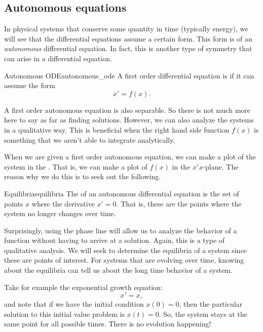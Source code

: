             \subsection{Autonomous equations}

                In physical systems that conserve some quantity in time (typically energy), we will see that the differential equations assume a certain form.  This form is of an \emph{autonomous} differential equation. In fact, this is another type of symmetry that can arise in a differential equation.

                \begin{df}{Autonomous ODE}{autonomous_ode}
                    A first order differential equation is  if it can assume the form
                    \[
                    x'=f(x).
                    \]
                \end{df}
                \noindent A first order autonomous equation is also separable. So there is not much more here to say as far as finding solutions. However, we can also analyze the systems in a qualitative way.  This is beneficial when the right hand side function $f(x)$ is something that we aren't able to integrate analytically.

                When we are given a first order autonomous equation, we can make a plot of the system in the . That is, we can make a plot of $f(x)$ in the $x'x$-plane.  The reason why we do this is to seek out the following.

                \begin{df}{Equilibria}{equilibria}
                    The  of an autonomous differential equation is the set of points $x$ where the derivative $x'=0$. That is, these are the points where the system no longer changes over time.
                \end{df}

                Surprisingly, using the phase line will allow us to analyze the behavior of a function without having to arrive at a solution. Again, this is a type of qualitative analysis. We will seek to determine the equilibria of a system since these are points of interest. For systems that are evolving over time, knowing about the equilibria can tell us about the long time behavior of a system.

                Take for example the exponential growth equation:
                \[
                x'=x,
                \]
                and note that if we have the initial condition $x(0)=0$, then the particular solution to this initial value problem is $x(t)=0$.  So, the system stays at the same point for all possible times.  There is no evolution happening!

